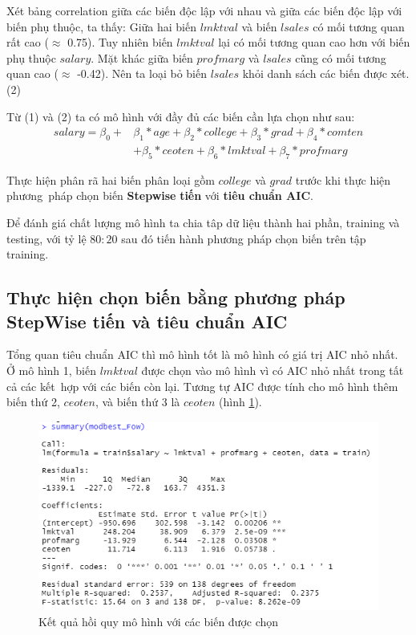 Xét bảng correlation giữa các biến độc lập với nhau và giữa các biến độc lập với biến phụ thuộc, ta thấy: Giữa hai biến $\textit{lmktval}$ và biến $\textit{lsales}$ có mối tương quan rất cao ($\approx$ 0.75). Tuy nhiên biến $\textit{lmktval}$ lại có mối tương quan cao hơn với biến phụ thuộc $\textit{salary}$. Mặt khác giữa biến $\textit{profmarg}$ và $\textit{lsales}$ cũng có mối tương quan cao ($\approx$ -0.42). Nên ta loại bỏ biến $\textit{lsales}$ khỏi danh sách các biến được xét. (2)

Từ (1) và (2) ta có mô hình với đầy đủ các biến cần lựa chọn như sau:
\begin{equation}\label{eq-b1:full-model}
	\begin{split}
		salary 	= \beta_0 + &\beta_1*age + \beta_2*college + \beta_3*grad + \beta_4*comten\\
		&+ \beta_5*ceoten + \beta_6*lmktval + \beta_7*profmarg
	\end{split}
\end{equation}


Thực hiện phân rã hai biến phân loại gồm $college$ và $grad$ trước khi thực hiện phương~pháp chọn biến \textbf{Stepwise} \textbf{tiến} với \textbf{tiêu chuẩn AIC}.

Để đánh giá chất lượng mô hình ta chia tâp dữ liệu thành hai phần, training và testing, với tỷ lệ $80:20$ sau đó tiến hành phương pháp chọn biến trên tập training.

\subsection*{Thực hiện chọn biến bằng phương pháp StepWise tiến và tiêu chuẩn AIC}


Tổng quan tiêu chuẩn AIC thì mô hình tốt là mô hình có giá trị AIC nhỏ nhất. Ở mô hình 1, biến $\textit{lmktval}$ được chọn vào mô hình vì có AIC nhỏ nhất trong tất cả các kết~hợp với các biến còn lại. Tương tự AIC được tính cho mô hình thêm biến thứ 2, $\textit{ceoten}$, và biến thứ 3 là $\textit{ceoten}$ (hình \ref{ex1:model:1}).

\begin{figure}[h!]
	\centering
	\includegraphics[width=.7\linewidth]{../Photo Of Result/B1_summary.PNG}  
	\caption{Kết quả hồi quy mô hình với các biến được chọn}
	\label{ex1:model:1}
\end{figure}

